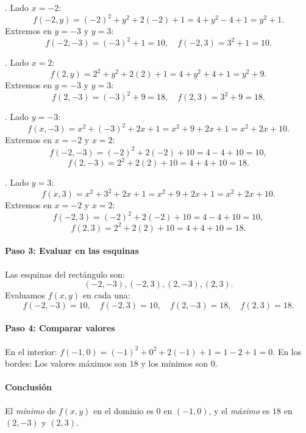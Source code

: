 \documentclass[11pt]{book}
\theoremstyle{definicion}
\theoremstyle{teorema}
\theoremstyle{ejemplo}
\begin{document}
. Lado \( x = -2 \):
   \[
   f(-2, y) = (-2)^2 + y^2 + 2(-2) + 1 = 4 + y^2 - 4 + 1 = y^2 + 1.
   \]
   Extremos en \( y = -3 \) y \( y = 3 \):
   \[
   f(-2, -3) = (-3)^2 + 1 = 10, \quad f(-2, 3) = 3^2 + 1 = 10.
   \]

. Lado \( x = 2 \):
   \[
   f(2, y) = 2^2 + y^2 + 2(2) + 1 = 4 + y^2 + 4 + 1 = y^2 + 9.
   \]
   Extremos en \( y = -3 \) y \( y = 3 \):
   \[
   f(2, -3) = (-3)^2 + 9 = 18, \quad f(2, 3) = 3^2 + 9 = 18.
   \]

. Lado \( y = -3 \):
   \[
   f(x, -3) = x^2 + (-3)^2 + 2x + 1 = x^2 + 9 + 2x + 1 = x^2 + 2x + 10.
   \]
   Extremos en \( x = -2 \) y \( x = 2 \):
   \[
   f(-2, -3) = (-2)^2 + 2(-2) + 10 = 4 - 4 + 10 = 10,
   \]
   \[
   f(2, -3) = 2^2 + 2(2) + 10 = 4 + 4 + 10 = 18.
   \]

. Lado \( y = 3 \):
   \[
   f(x, 3) = x^2 + 3^2 + 2x + 1 = x^2 + 9 + 2x + 1 = x^2 + 2x + 10.
   \]
   Extremos en \( x = -2 \) y \( x = 2 \):
   \[
   f(-2, 3) = (-2)^2 + 2(-2) + 10 = 4 - 4 + 10 = 10,
   \]
   \[
   f(2, 3) = 2^2 + 2(2) + 10 = 4 + 4 + 10 = 18.
   \]

\paragraph*{Paso 3: Evaluar en las esquinas}

\noindent
Las esquinas del rectángulo son:
\[
(-2, -3), (-2, 3), (2, -3), (2, 3).
\]
Evaluamos \( f(x, y) \) en cada una:
\[
f(-2, -3) = 10, \quad f(-2, 3) = 10, \quad f(2, -3) = 18, \quad f(2, 3) = 18.
\]

\paragraph*{Paso 4: Comparar valores}

En el interior: \( f(-1, 0) = (-1)^2 + 0^2 + 2(-1) + 1 = 1 - 2 + 1 = 0 \).
En los bordes: Los valores máximos son \( 18 \) y los mínimos son \( 0 \).

\paragraph*{Conclusión}

El \emph{mínimo} de \( f(x, y) \) en el dominio es \( 0 \) en \( (-1, 0) \), y el \emph{máximo} es \( 18 \) en \( (2, -3) \) y \( (2, 3) \).

\end{document}
